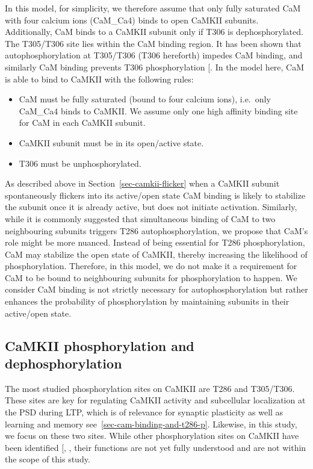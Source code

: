 \documentclass[
  11pt,
  letterpaper,
]{scrreprt}
\providecommand{\tightlist}{%
  \setlength{\itemsep}{0pt}\setlength{\parskip}{0pt}}\usepackage{longtable,booktabs,array}
\begin{document}
In this model, for simplicity, we therefore assume that only fully
saturated CaM with four calcium ions (CaM\_Ca4) binds to open CaMKII
subunits. Additionally, CaM binds to a CaMKII subunit only if T306 is
dephosphorylated. The T305/T306 site lies within the CaM binding region.
It has been shown that autophosphorylation at T305/T306 (T306 hereforth)
impedes CaM binding, and similarly CaM binding prevents T306
phosphorylation {[}\citeproc{ref-rellos2010Structure}{465}{]}. In the
model here, CaM is able to bind to CaMKII with the following rules:

\begin{itemize}
\tightlist
\item
  CaM must be fully saturated (bound to four calcium ions), i.e.~only
  CaM\_Ca4 binds to CaMKII. We assume only one high affinity binding
  site for CaM in each CaMKII subunit.
\item
  CaMKII subunit must be in its open/active state.
\item
  T306 must be unphosphorylated.
\end{itemize}

As described above in Section~\ref{sec-camkii-flicker} when a CaMKII
subunit spontaneously flickers into its active/open state CaM binding is
likely to stabilize the subunit once it is already active, but does not
initiate activation. Similarly, while it is commonly suggested that
simultaneous binding of CaM to two neighbouring subunits triggers T286
autophosphorylation, we propose that CaM's role might be more nuanced.
Instead of being essential for T286 phosphorylation, CaM may stabilize
the open state of CaMKII, thereby increasing the likelihood of
phosphorylation. Therefore, in this model, we do not make it a
requirement for CaM to be bound to neighbouring subunits for
phosphorylation to happen. We consider CaM binding is not strictly
necessary for autophosphorylation but rather enhances the probability of
phosphorylation by maintaining subunits in their active/open state.

\subsection{CaMKII phosphorylation and
dephosphorylation}\label{camkii-phosphorylation-and-dephosphorylation}

The most studied phosphorylation sites on CaMKII are T286 and T305/T306.
These sites are key for regulating CaMKII activity and subcellular
localization at the PSD during LTP, which is of relevance for synaptic
plasticity as well as learning and memory
see~\ref{sec-cam-binding-and-t286-p}. Likewise, in this study, we focus
on these two sites. While other phosphorylation sites on CaMKII have
been identified {[},
\citeproc{ref-gangopadhyay2008Regulation}{467}{]}, their functions are
not yet fully understood and are not within the scope of this study.
\end{document}
